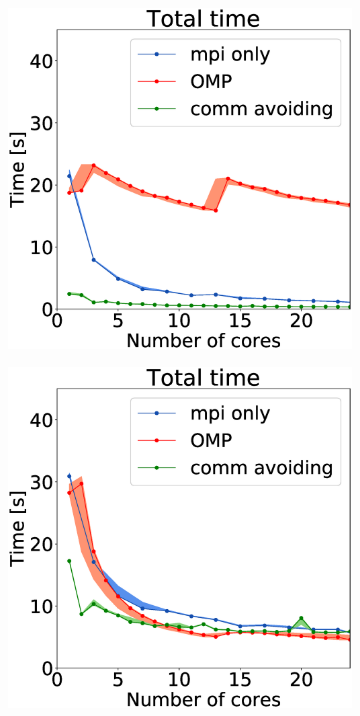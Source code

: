 \newlength{\fsize}
\setlength{\fsize}{0.15\textwidth}
\begin{figure}
	
\begin{subfigure}[c]{\fsize}
        \includegraphics[width=\textwidth]{plots/50000our_impl}
        \label{fig:mpi_omp_commavoiding_euler_1}
    \end{subfigure}
\begin{subfigure}[c]{\fsize}
    \includegraphics[width=\textwidth]{plots/10000our_impl}

\end{subfigure}
\end{figure}
